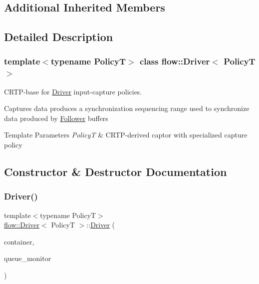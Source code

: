 \subsection*{Additional Inherited Members}


\subsection{Detailed Description}
\subsubsection*{template$<$typename PolicyT$>$\newline
class flow\+::\+Driver$<$ Policy\+T $>$}

C\+R\+T\+P-\/base for \hyperlink{classflow_1_1_driver}{Driver} input-\/capture policies. 

Captures data produces a synchronization sequencing range used to synchronize data produced by \hyperlink{classflow_1_1_follower}{Follower} buffers


\begin{DoxyTemplParams}{Template Parameters}
{\em PolicyT} & C\+R\+T\+P-\/derived captor with specialized capture policy \\
\hline
\end{DoxyTemplParams}


\subsection{Constructor \& Destructor Documentation}
\mbox{\label{classflow_1_1_driver_a195110b2344944c9154290e3aa0e6684}} 
\subsubsection{\texorpdfstring{Driver()}{Driver()}}
{\footnotesize\ttfamily template$<$typename PolicyT$>$ \\
\hyperlink{classflow_1_1_driver}{flow\+::\+Driver}$<$ PolicyT $>$\+::\hyperlink{classflow_1_1_driver}{Driver} (\begin{DoxyParamCaption}\item[{const \hyperlink{classflow_1_1_driver_a422446d9a2d8ae99613e3c5728956921}{Dispatch\+Container\+Type} \&}]{container,  }\item[{const \hyperlink{classflow_1_1_driver_ab20e67754359b2e562ef594672ee8855}{Dispatch\+Queue\+Monitor\+Type} \&}]{queue\+\_\+monitor }\end{DoxyParamCaption})\hspace{0.3cm}{\ttfamily [explicit]}}



